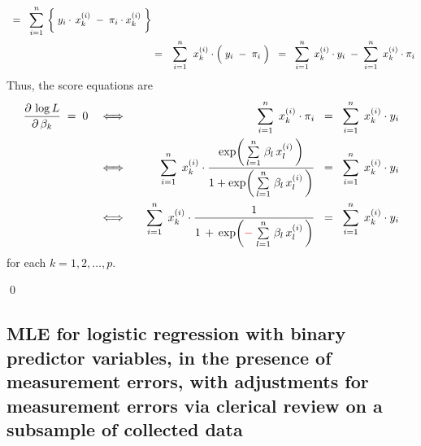 \begin{enumerate}
\begin{eqnarray*}
	\;\; = \;\;
		\overset{n}{\underset{i=1}{\sum}}\,
		\left\{\;
			y_{i}\cdot\,x^{(i)}_{k}
			\; \overset{{\color{white}\vert}}{-} \;
			\pi_{i} \cdot x^{(i)}_{k}
			\;\right\}	
	\\
	&=&
		\overset{n}{\underset{i=1}{\sum}}\;\;
		x^{(i)}_{k}	
		\cdot
		\left(\; y_{i} \; \overset{{\color{white}.}}{-} \; \pi_{i} \;\right)
	\;\; = \;\;
		\overset{n}{\underset{i=1}{\sum}}\;\, x^{(i)}_{k} \cdot y_{i}
		\; - \;
		\overset{n}{\underset{i=1}{\sum}}\;\, x^{(i)}_{k} \cdot \pi_{i}
	\end{eqnarray*}
	Thus, the score equations are
	\begin{eqnarray*}
	\dfrac{\partial\,\log L}{\partial\,\beta_{k}} \;=\; 0
	&\quad\Longleftrightarrow\quad&
		\overset{n}{\underset{i=1}{\sum}}\;\, x^{(i)}_{k} \cdot \pi_{i}
		\;\; = \;\;
		\overset{n}{\underset{i=1}{\sum}}\;\, x^{(i)}_{k} \cdot y_{i}
	\\
	&\quad\Longleftrightarrow\quad&
		\overset{n}{\underset{i=1}{\sum}}\;\, x^{(i)}_{k} \cdot
		\dfrac{
			\exp\!\left(\,\overset{n}{\underset{l=1}{\sum}}\;\beta_{l}\,x^{(i)}_{l}\,\right)
			}{
			1 + \exp\!\left(\,\overset{n}{\underset{l=1}{\sum}}\;\beta_{l}\,x^{(i)}_{l}\,\right)
			}
		\;\; = \;\;
		\overset{n}{\underset{i=1}{\sum}}\;\, x^{(i)}_{k} \cdot y_{i}
	\\
	&\quad\Longleftrightarrow\quad&
		\overset{n}{\underset{i=1}{\sum}}\;\, x^{(i)}_{k} \cdot
		\dfrac{1}{1 \,+\, \exp\!\left({\color{red}-}\;\overset{n}{\underset{l=1}{\sum}}\;\beta_{l}\,x^{(i)}_{l}\,\right)}
		\;\; = \;\;
		\overset{n}{\underset{i=1}{\sum}}\;\, x^{(i)}_{k} \cdot y_{i}
	\end{eqnarray*}
	for each $k = 1,2,\ldots,p$.
\end{enumerate}
\qed


\subsection{MLE for logistic regression with binary predictor variables,
in the presence of measurement errors,
with adjustments for measurement errors via clerical review on a subsample of collected data}

